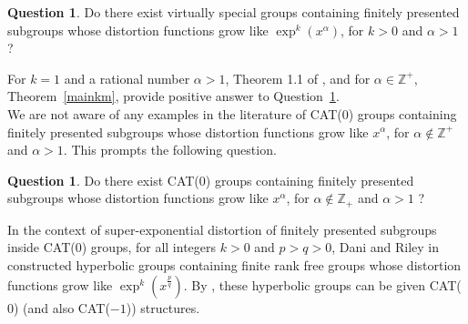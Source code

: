 \documentclass[oneside,11pt,reqno]{amsart}
\theoremstyle{definition}
\newtheorem{ques}[thm]{Question}
\begin{document}
\begin{ques}\label{q2} Do there exist virtually special groups containing finitely presented subgroups whose distortion functions grow like $\exp^k(x^{\alpha})$, for $k > 0$ and $\alpha > 1$ ?
\end{ques}

For $k=1$ and a rational number $\alpha > 1$, Theorem 1.1 of \cite{DARI}, and for $\alpha \in \mathbb{Z}^+$, Theorem~\ref{mainkm}, provide positive answer to Question~\ref{q2}.\\

We are not aware of any examples in the literature of CAT($0$) groups containing finitely presented subgroups whose distortion functions grow like $x^{\alpha}$, for $\alpha \not\in \mathbb{Z}^{+}$ and $\alpha > 1$. This prompts the following question.

\begin{ques}\label{q3}  Do there exist CAT($0$) groups containing finitely presented subgroups whose distortion functions grow like $x^{\alpha}$, for $\alpha \not\in \mathbb{Z}_{+}$ and $\alpha > 1$ ?
\end{ques}

In the context of super-exponential distortion of finitely presented subgroups inside CAT($0$) groups, for all integers $k >0$ and $p > q >0$, Dani and Riley in \cite{DARI} constructed hyperbolic groups containing finite rank free groups whose distortion functions grow like $\exp^k(x^{\frac{p}{q}})$. By \cite[Remark 15.6]{DARI}, these hyperbolic groups can be given CAT($0$) (and also CAT($-1$)) structures. 
\bigskip

\bigskip


\end{document}
